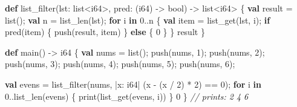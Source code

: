 \documentclass[
  english,
]{book}
\newenvironment{Shaded}{\begin{snugshade}}{\end{snugshade}}
\newcommand{\CommentTok}[1]{\textcolor[rgb]{0.42,0.60,0.33}{\textit{#1}}}
\newcommand{\ControlFlowTok}[1]{\textcolor[rgb]{0.77,0.53,0.75}{\textbf{#1}}}
\newcommand{\DataTypeTok}[1]{\textcolor[rgb]{0.31,0.79,0.69}{#1}}
\newcommand{\DecValTok}[1]{\textcolor[rgb]{0.71,0.81,0.66}{#1}}
\newcommand{\FunctionTok}[1]{\textcolor[rgb]{0.86,0.86,0.67}{#1}}
\newcommand{\KeywordTok}[1]{\textcolor[rgb]{0.34,0.61,0.84}{\textbf{#1}}}
\newcommand{\NormalTok}[1]{\textcolor[rgb]{0.83,0.83,0.83}{#1}}
\newcommand{\OperatorTok}[1]{\textcolor[rgb]{0.83,0.83,0.83}{#1}}
\begin{document}
\begin{Shaded}
\begin{Highlighting}[]
\KeywordTok{def} \FunctionTok{list\_filter}\NormalTok{(lst: }\DataTypeTok{list}\OperatorTok{\textless{}}\DataTypeTok{i64}\OperatorTok{\textgreater{}}\NormalTok{, pred: (}\DataTypeTok{i64}\NormalTok{) }\OperatorTok{{-}\textgreater{}} \DataTypeTok{bool}\NormalTok{) }\OperatorTok{{-}\textgreater{}} \DataTypeTok{list}\OperatorTok{\textless{}}\DataTypeTok{i64}\OperatorTok{\textgreater{}}\NormalTok{ \{}
    \KeywordTok{val} \DataTypeTok{result} \OperatorTok{=} \DataTypeTok{list}\NormalTok{();}
    \KeywordTok{val}\NormalTok{ n }\OperatorTok{=} \FunctionTok{list\_len}\NormalTok{(lst);}
    \ControlFlowTok{for}\NormalTok{ i }\ControlFlowTok{in} \DecValTok{0}\OperatorTok{..}\NormalTok{n \{}
        \KeywordTok{val}\NormalTok{ item }\OperatorTok{=} \FunctionTok{list\_get}\NormalTok{(lst, i);}
        \ControlFlowTok{if}\NormalTok{ pred(item) \{}
            \FunctionTok{push}\NormalTok{(}\DataTypeTok{result}\NormalTok{, item)}
\NormalTok{        \} }\ControlFlowTok{else}\NormalTok{ \{}
            \DecValTok{0}
\NormalTok{        \}}
\NormalTok{    \}}
    \DataTypeTok{result}
\NormalTok{\}}

\KeywordTok{def}\NormalTok{ main() }\OperatorTok{{-}\textgreater{}} \DataTypeTok{i64}\NormalTok{ \{}
    \KeywordTok{val}\NormalTok{ nums }\OperatorTok{=} \DataTypeTok{list}\NormalTok{();}
    \FunctionTok{push}\NormalTok{(nums, }\DecValTok{1}\NormalTok{);}
    \FunctionTok{push}\NormalTok{(nums, }\DecValTok{2}\NormalTok{);}
    \FunctionTok{push}\NormalTok{(nums, }\DecValTok{3}\NormalTok{);}
    \FunctionTok{push}\NormalTok{(nums, }\DecValTok{4}\NormalTok{);}
    \FunctionTok{push}\NormalTok{(nums, }\DecValTok{5}\NormalTok{);}
    \FunctionTok{push}\NormalTok{(nums, }\DecValTok{6}\NormalTok{);}

    \KeywordTok{val}\NormalTok{ evens }\OperatorTok{=} \FunctionTok{list\_filter}\NormalTok{(nums, }\OperatorTok{|}\NormalTok{x: }\DataTypeTok{i64}\OperatorTok{|}\NormalTok{ (x }\OperatorTok{{-}}\NormalTok{ (x }\OperatorTok{/} \DecValTok{2}\NormalTok{) }\OperatorTok{*} \DecValTok{2}\NormalTok{) }\OperatorTok{==} \DecValTok{0}\NormalTok{);}
    \ControlFlowTok{for}\NormalTok{ i }\ControlFlowTok{in} \DecValTok{0}\OperatorTok{..}\FunctionTok{list\_len}\NormalTok{(evens) \{}
        \FunctionTok{print}\NormalTok{(}\FunctionTok{list\_get}\NormalTok{(evens, i))}
\NormalTok{    \}}
    \DecValTok{0}
\NormalTok{\}}
\CommentTok{// prints: 2 4 6}
\end{Highlighting}
\end{Shaded}
\end{document}

